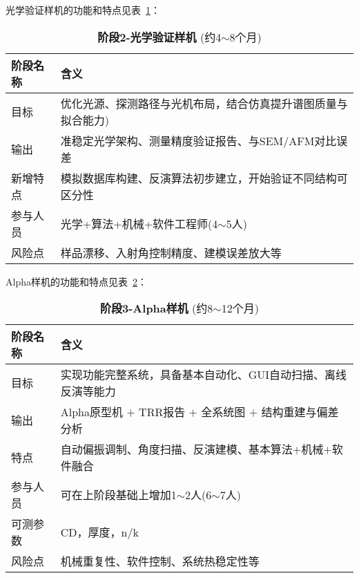 光学验证样机的功能和特点见表~\ref{table:OFB}：
\begin{table}[h!]
\centering
\caption{\textbf{阶段2-光学验证样机} (约4$\sim$8个月)}
\label{table:OFB}
\begin{tabular}{l|l}
\hline\hline
\textbf{阶段名称} & \textbf{含义} \\ \hline
目标 & 优化光源、探测路径与光机布局，结合仿真提升谱图质量与拟合能力) \\ \hline
输出 & 准稳定光学架构、测量精度验证报告、与SEM/AFM对比误差 \\ \hline
新增特点 & 模拟数据库构建、反演算法初步建立，开始验证不同结构可区分性 \\ \hline
参与人员 & 光学+算法+机械+软件工程师(4$\sim$5人) \\ \hline
风险点 & 样品漂移、入射角控制精度、建模误差放大等 \\
\hline\hline
\end{tabular}
\end{table}

Alpha样机的功能和特点见表~\ref{table:alpha}：
\begin{table}[h!]
\centering
\caption{\textbf{阶段3-Alpha样机} (约8$\sim$12个月)}
\label{table:alpha}
\begin{tabular}{l|l}
\hline\hline
\textbf{阶段名称} & \textbf{含义} \\ \hline
目标 & 实现功能完整系统，具备基本自动化、GUI自动扫描、离线反演等能力 \\ \hline
输出 & Alpha原型机 $+$ TRR报告 $+$ 全系统图 $+$ 结构重建与偏差分析 \\ \hline
特点 & 自动偏振调制、角度扫描、反演建模、基本算法$+$机械$+$软件融合 \\ \hline
参与人员 & 可在上阶段基础上增加1$\sim$2人(6$\sim$7人)  \\ \hline
可测参数 & CD，厚度，n/k  \\ \hline
风险点 & 机械重复性、软件控制、系统热稳定性等 \\
\hline\hline
\end{tabular}
\end{table}









